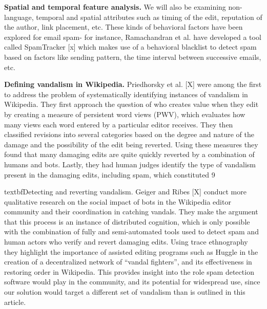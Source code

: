 \documentclass[letterpaper]{sig-alternate}
\begin{document}
\textbf{Spatial and temporal feature analysis.} We will also be examining non-language, temporal and spatial attributes such as timing of the edit, reputation of the author, link placement, etc.  These kinds of behavioral factors have been explored for email spam- for instance, Ramachandran et al. have developed a tool called SpamTracker [x] which makes use of a behavioral blacklist to detect spam based on factors like sending pattern, the time interval between successive emails, etc.

\textbf{Defining vandalism in Wikipedia.} Priedhorsky et al. [X] were among the first to address the problem of systematically identifying instances of vandalism in Wikipedia. They first approach the question of who creates value when they edit by creating a measure of persistent word views (PWV), which evaluates how many views each word entered by a particular editor receives. They then classified revisions into several categories based on the degree and nature of the damage and the possibility of the edit being reverted. Using these measures they found that many damaging edits are quite quickly reverted by a combination of humans and bots. Lastly, they had human judges identify the type of vandalism present in the damaging edits, including spam, which constituted 9%

textbf{Detecting and reverting vandalism.}  Geiger and Ribes [X] conduct more qualitative research on the social impact of bots in the Wikipedia editor community and their coordination in catching vandals. They make the argument that this process is an instance of distributed cognition, which is only possible with the combination of fully and semi-automated tools used to detect spam and human actors who verify and revert damaging edits. Using trace ethnography they highlight the importance of assisted editing programs such as Huggle in the creation of a decentralized network of “vandal fighters”, and its effectiveness in restoring order in Wikipedia. This provides insight into the role spam detection software would play in the community, and its potential for widespread use, since our solution would target a different set of vandalism than is outlined in this article.
\end{document}
